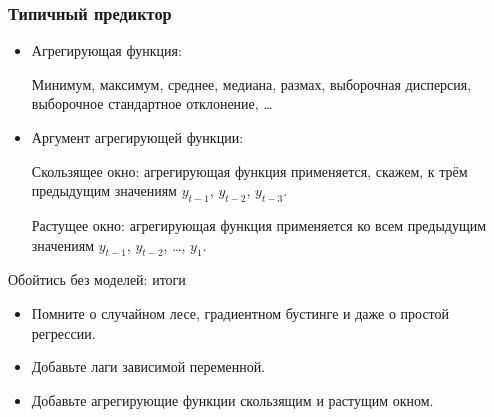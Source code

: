 \begin{frame}
  \frametitle{Типичный предиктор}

  \begin{itemize}[<+->]
    \item \alert{Агрегирующая функция}:
    
    Минимум, максимум, среднее, медиана, размах, выборочная дисперсия, выборочное стандартное отклонение, \ldots

    \item \alert{Аргумент} агрегирующей функции:
    
    \alert{Скользящее окно}: агрегирующая функция применяется, скажем, к трём предыдущим значениям $y_{t-1}$, $y_{t-2}$, $y_{t-3}$.

    \alert{Растущее окно}: агрегирующая функция применяется ко всем предыдущим значениям $y_{t-1}$, $y_{t-2}$, \ldots,  $y_{1}$.
  \end{itemize}

\end{frame}



\begin{frame}{Обойтись без моделей: итоги}

  \begin{itemize}[<+->]
    \item Помните о \alert{случайном лесе}, \alert{градиентном бустинге} и даже о \alert{простой регрессии}.
    \item Добавьте \alert{лаги зависимой переменной}.
    \item Добавьте \alert{агрегирующие функции} скользящим и растущим окном. 
  \end{itemize}
\end{frame}

